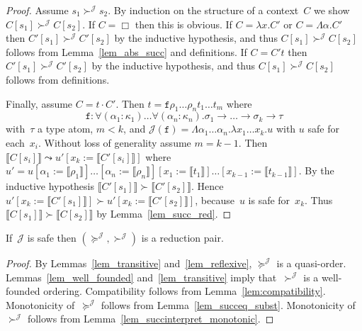 \documentclass[a4paper,UKenglish,cleveref,autoref,numberwithinsect]{lipics-v2019}
\theoremstyle{definition}
\newcommand{\arrtype}{\rightarrow}
\newcommand{\app}[2]{#1 \cdot #2}
\newcommand{\subst}[2]{#1:=#2}
\newcommand{\abs}[2]{\lambda #1.#2}
\newcommand{\tabs}[2]{\Lambda #1.#2}
\newcommand{\typeinterpret}[1]{\llbracket #1 \rrbracket}
\newcommand{\interpret}[1]{\llbracket #1 \rrbracket}
\newcommand{\Termmap}{\mathcal{J}}
\newcommand{\succinterpret}{\succ^{\Termmap}}
\newcommand{\succeqinterpret}{\succeq^{\Termmap}}
\begin{document}
\begin{proof}
  Assume $s_1 \succinterpret s_2$. By induction on the structure of a
  context~$C$ we show $C[s_1] \succinterpret C[s_2]$. If $C=\Box$ then
  this is obvious. If $C = \abs{x}{C'}$ or $C = \tabs{\alpha}{C'}$
  then $C'[s_1] \succinterpret C'[s_2]$ by the inductive hypothesis,
  and thus $C[s_1] \succinterpret C[s_2]$ follows from
  Lemma~\ref{lem_abs_succ} and definitions. If $C = C' t$ then
  $C'[s_1] \succinterpret C'[s_2]$ by the inductive hypothesis, and
  thus $C[s_1] \succinterpret C[s_2]$ follows from definitions.

  Finally, assume $C = \app{t}{C'}$. Then $t = \mathtt{f} \rho_1
  \ldots \rho_n t_1 \ldots t_m$ where
  \[
  \mathtt{f} : \forall (\alpha_1 : \kappa_1) \ldots \forall (\alpha_n
  : \kappa_n) . \sigma_1 \arrtype \ldots \arrtype \sigma_k \arrtype
  \tau
  \]
  with~$\tau$ a type atom, $m < k$, and $\Termmap(\mathtt{f}) =
  \tabs{\alpha_1 \dots \alpha_n}{\abs{x_1 \dots x_k}{u}}$ with $u$
  safe for each~$x_i$. Without loss of generality assume $m=k-1$. Then
  $\interpret{C[s_i]} \leadsto u'[\subst{x_k}{\interpret{C'[s_i]}}]$
  where
  $u'=u[\subst{\alpha_1}{\typeinterpret{\rho_1}}]\ldots[\subst{\alpha_n}{\typeinterpret{\rho_n}}][\subst{x_1}{\interpret{t_1}}]\ldots[\subst{x_{k-1}}{\interpret{t_{k-1}}}]$. By
  the inductive hypothesis $\interpret{C'[s_1]} \succ
  \interpret{C'[s_2]}$. Hence $u'[\subst{x_k}{\interpret{C'[s_1]}}]
  \succ u'[\subst{x_k}{\interpret{C'[s_2]}}]$, because~$u$ is safe
  for~$x_k$. Thus $\interpret{C[s_1]} \succ \interpret{C[s_2]}$ by
  Lemma~\ref{lem_succ_red}.
\end{proof}

\begin{theorem}\label{thm_reduction_pair}
  If~$\Termmap$ is safe then $(\succeqinterpret,\succinterpret)$ is a
  reduction pair.
\end{theorem}

\begin{proof}
  By Lemmas~\ref{lem_transitive} and~\ref{lem_reflexive},
  $\succeqinterpret$ is a
  quasi-order. Lemmas~\ref{lem_well_founded}
  and~\ref{lem_transitive} imply that~$\succinterpret$ is a
  well-founded ordering. Compatibility follows from
  Lemma~\ref{lem:compatibility}. Monotonicity of~$\succeqinterpret$
  follows from Lemma~\ref{lem_succeq_subst}. Monotonicity
  of~$\succinterpret$ follows from
  Lemma~\ref{lem_succinterpret_monotonic}.
\end{proof}
\end{document}
